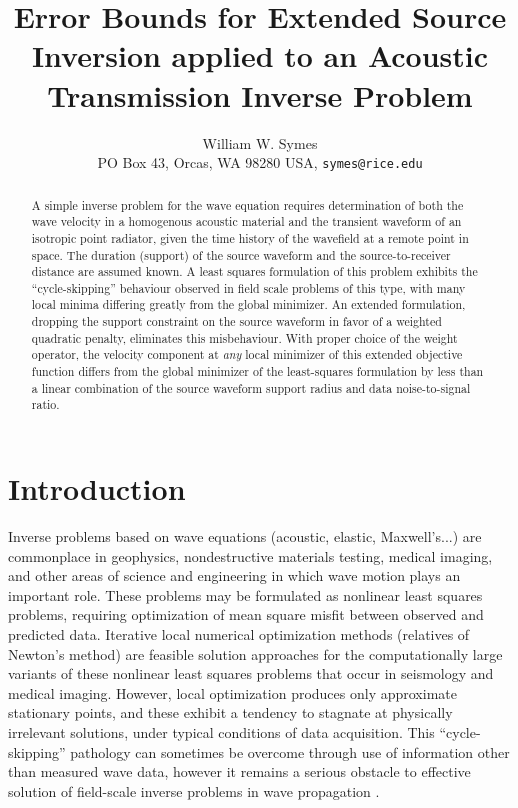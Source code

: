 %
\title{Error Bounds for Extended Source Inversion applied to an Acoustic Transmission Inverse Problem}
\author{William W. Symes\\
PO Box 43, Orcas, WA 98280 USA, {\tt symes@rice.edu}}



\maketitle
\begin{abstract}
  A simple inverse problem for the wave equation requires
  determination of both the wave velocity in a homogenous acoustic
  material and the transient waveform of an isotropic point radiator,
  given the time history of the wavefield at a remote point in
  space. The duration (support) of the source waveform and the
  source-to-receiver distance are assumed known. A least squares
  formulation of this problem exhibits the ``cycle-skipping''
  behaviour observed in field scale problems of this type, with many
  local minima differing greatly from the global minimizer. An
  extended formulation, dropping the support constraint on the source
  waveform in favor of a weighted quadratic penalty, eliminates this
  misbehaviour. With proper choice of the weight operator, the
  velocity component at {\em any} local minimizer of this extended
  objective function differs from the global
  minimizer of the least-squares formulation by less than a linear
  combination of the source waveform support radius and data
  noise-to-signal ratio.

\end{abstract}

\section{Introduction}
Inverse problems based on wave equations (acoustic, elastic,
Maxwell's...) are commonplace in geophysics, nondestructive materials
testing, medical imaging, and other areas of science and engineering
in which wave motion plays an important role. These problems may be
formulated as nonlinear least squares problems, requiring optimization
of mean square misfit between observed and predicted data. Iterative
local numerical optimization methods (relatives of Newton's method)
are feasible solution approaches for the computationally large
variants of these nonlinear least squares problems that occur in
seismology and medical imaging. However, local optimization produces
only approximate stationary points, and these exhibit a tendency to
stagnate at physically irrelevant solutions, under typical conditions
of data acquisition. This ``cycle-skipping''
pathology can sometimes be overcome through use of information other than
measured wave data, however it remains a serious obstacle to effective
solution of field-scale inverse problems in wave propagation
\cite[]{GauTarVir:86,VirieuxOperto:09,Fichtner:10,Plessix:10,Schuster:17}.

